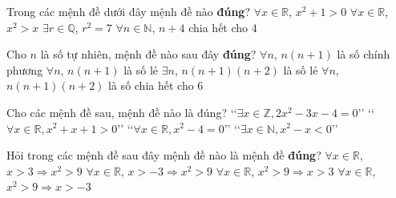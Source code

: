 \begin{ex}%
	Trong các mệnh đề dưới đây mệnh đề  nào \textbf{đúng}?
	 \choice
		 {\True $\forall x \in \mathbb{R}$, $x^2+1>0$}
		{$\forall x \in \mathbb{R}$,  $x^2>x$}
		 {$\exists r \in \mathbb{Q}$, $r^2=7$}
		 {$\forall n \in \mathbb{N}$, $n+4$ chia hết cho $4$}
\end{ex}

\begin{ex}%
	Cho $n$ là số  tự nhiên, mệnh đề nào sau đây \textbf{đúng}?
	 \choice
		{$\forall n$, $n\left(n+1\right)$ là số chính  phương}
		{$\forall n$, $n\left(n+1\right)$ là  số lẻ}
		{$\exists n$, $n\left(n+1\right)\left(n+2\right)$ là  số lẻ}
		{\True $\forall n$,  $n\left(n+1\right)\left(n+2\right)$ là số chia hết cho $6$}
\end{ex}

\begin{ex}%
	Cho các mệnh đề  sau, mệnh đề nào là đúng?
	 \choice
		 {\lq\lq $\exists x\in \mathbb{Z}, 2x^2-3x-4=0$\rq\rq}
		{\True \lq\lq $\forall x\in \mathbb{R}, x^2+x+1> 0$\rq\rq} 
		{\lq\lq $\forall x\in  \mathbb{R}, x^2-4=0$\rq\rq}
		{\lq\lq $\exists x\in \mathbb{N}, x^2-x  < 0$\rq\rq}
\end{ex}

\begin{ex}%
	Hỏi  trong các mệnh đề sau đây mệnh đề nào là mệnh đề \textbf{đúng}?
	\choice 
		{\True $\forall x  \in \mathbb{R}$, $x>3 \Rightarrow x^2>9$}
		{$\forall  x \in \mathbb{R}$, $x>-3 \Rightarrow x^2>9$}
		{$\forall x \in  \mathbb{R}$, $x^2>9 \Rightarrow x>3$}
		{$\forall x \in \mathbb{R}$,  $x^2>9 \Rightarrow x>-3$}
\end{ex}


